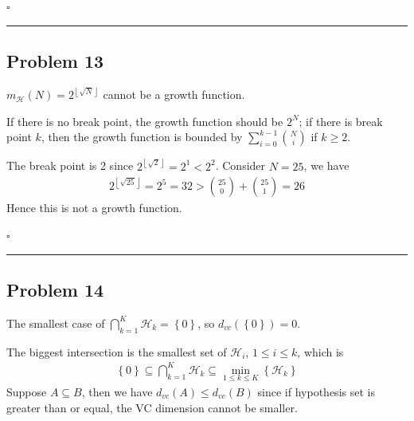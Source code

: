 \documentclass[12pt]{article}
\newcommand*{\QEDB}{\hfill\ensuremath{\square}}
\newcommand{\CBrackets}[1]{\left\{#1\right\}}
\newcommand{\ParTh}[1]{\left(#1\right)}
\newcommand{\Floor}[1]{\left\lfloor#1\right\rfloor}
\newcommand{\horrule}[1]{\rule{\linewidth}{#1}}
\begin{document}
\QEDB

\horrule{0.5pt}

\subsection*{Problem 13}

$m_{\mathcal{H}}\ParTh{N}=2^{\Floor{\sqrt{N}}}$ cannot be a growth function.

If there is no break point, the growth function should be $2^N$; if there is break point $k$, then the growth function is bounded by $\sum_{i=0}^{k-1}\binom{N}{i}$ if $k\geq 2$.

The break point is 2 since $2^{\Floor{\sqrt{2}}}=2^1<2^2$. Consider $N=25$, we have
\begin{align}
2^{\Floor{\sqrt{25}}}=2^5=32>\binom{25}{0}+\binom{25}{1}=26
\end{align}
Hence this is not a growth function.

\QEDB

\horrule{0.5pt}

\subsection*{Problem 14}

The smallest case of $\bigcap^K_{k=1}\mathcal{H}_k=\CBrackets{0}$, so $d_{vc}\ParTh{\CBrackets{0}}=0$.

The biggest intersection is the smallest set of $\mathcal{H}_i$, $1\leq i\leq k$, which is
\begin{align}
\CBrackets{0}\subseteq{\bigcap^K_{k=1}\mathcal{H}_k}\subseteq\min_{1\leq k\leq K}\CBrackets{{\mathcal{H}_k}}
\end{align}
Suppose $A\subseteq B$, then we have $d_{vc}\ParTh{A}\leq d_{vc}\ParTh{B}$ since if hypothesis set is greater than or equal, the VC dimension cannot be smaller.
\end{document}
